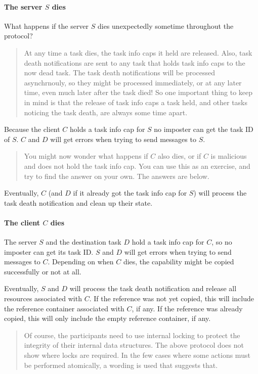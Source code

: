 \documentclass[9pt,a4paper]{extarticle}
\newenvironment{comment}{\footnotesize \begin{quote}}{\end{quote}}
\begin{document}
\paragraph{The server $S$ dies}
What happens if the server $S$ dies unexpectedly sometime throughout
the protocol?

\begin{comment}
  At any time a task dies, the task info caps it held are released.
  Also, task death notifications are sent to any task that holds task
  info caps to the now dead task.  The task death notifications will
  be processed asynchrnouly, so they might be processed immediately,
  or at any later time, even much later after the task died!  So one
  important thing to keep in mind is that the release of task info
  caps a task held, and other tasks noticing the task death, are
  always some time apart.
\end{comment}

Because the client $C$ holds a task info cap for $S$ no imposter can
get the task ID of $S$.  $C$ and $D$ will get errors when trying to
send messages to $S$.

\begin{comment}
  You might now wonder what happens if $C$ also dies, or if $C$ is
  malicious and does not hold the task info cap.  You can use this as
  an exercise, and try to find the answer on your own.  The answers
  are below.
\end{comment}

Eventually, $C$ (and $D$ if it already got the task info cap for $S$)
will process the task death notification and clean up their state.

\paragraph{The client $C$ dies}
The server $S$ and the destination task $D$ hold a task info cap for
$C$, so no imposter can get its task ID.  $S$ and $D$ will get errors
when trying to send messages to $C$.  Depending on when $C$ dies, the
capability might be copied successfully or not at all.

Eventually, $S$ and $D$ will process the task death notification and
release all resources associated with $C$.  If the reference was not
yet copied, this will include the reference container associated with
$C$, if any.  If the reference was already copied, this will only
include the empty reference container, if any.

\begin{comment}
  Of course, the participants need to use internal locking to protect
  the integrity of their internal data structures.  The above protocol
  does not show where locks are required.  In the few cases where some
  actions must be performed atomically, a wording is used that
  suggests that.
\end{comment}
\end{document}
